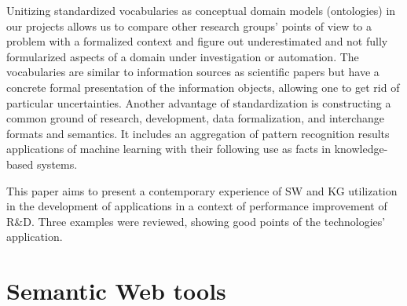 \documentclass[
]{ceurart}
\begin{document}
Unitizing standardized vocabularies as conceptual domain models (ontologies) in our projects allows us to compare other research groups' points of view to a problem with a formalized context and figure out underestimated and not fully formularized aspects of a domain under investigation or automation.  The vocabularies are similar to information sources as scientific papers but have a concrete formal presentation of the information objects, allowing one to get rid of particular uncertainties.  Another advantage of standardization is constructing a common ground of research, development, data formalization, and interchange formats and semantics.  It includes an aggregation of pattern recognition results applications of machine learning with their following use as facts in knowledge-based systems.

This paper aims to present a contemporary experience of SW and KG utilization in the development of applications in a context of performance improvement of R\&D.  Three examples were reviewed, showing good points of the technologies' application.


\section{Semantic Web tools}
\label{sec:sw-tools}
\end{document}
